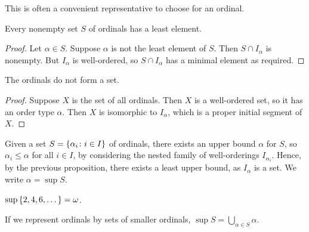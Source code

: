 This is often a convenient representative to choose for an ordinal.
\begin{proposition}
    Every nonempty set \( S \) of ordinals has a least element.
\end{proposition}
\begin{proof}
    Let \( \alpha \in S \).
    Suppose \( \alpha \) is not the least element of \( S \).
    Then \( S \cap I_\alpha \) is nonempty.
    But \( I_\alpha \) is well-ordered, so \( S \cap I_\alpha \) has a minimal element as required.
\end{proof}
\begin{theorem}
    The ordinals do not form a set.
\end{theorem}
\begin{proof}
    Suppose \( X \) is the set of all ordinals.
    Then \( X \) is a well-ordered set, so it has an order type \( \alpha \).
    Then \( X \) is isomorphic to \( I_\alpha \), which is a proper initial segment of \( X \).
\end{proof}
\begin{remark}
    Given a set \( S = \qty{\alpha_i \colon i \in I} \) of ordinals, there exists an upper bound \( \alpha \) for \( S \), so \( \alpha_i \leq \alpha \) for all \( i \in I \), by considering the nested family of well-orderings \( I_{\alpha_i} \).
    Hence, by the previous proposition, there exists a least upper bound, as \( I_\alpha \) is a set.
    We write \( \alpha = \sup S \).
\end{remark}
\begin{example}
    \( \sup \qty{2, 4, 6, \dots} = \omega \).
\end{example}
\begin{remark}
    If we represent ordinals by sets of smaller ordinals, \( \sup S = \bigcup_{\alpha \in S} \alpha \).
\end{remark}

